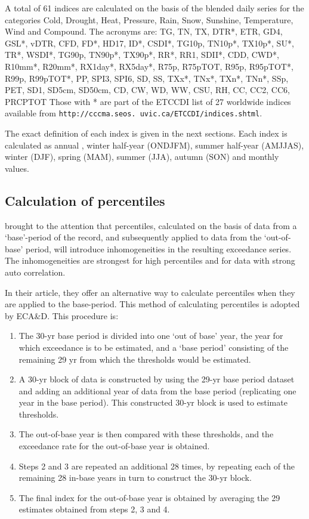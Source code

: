\documentclass[a4paper,11pt]{article}
\begin{document}
A total of 61 indices are calculated on the basis of the blended daily
series for the categories Cold, Drought, Heat, Pressure, Rain, Snow,
Sunshine, Temperature, Wind and Compound. The acronyms are: 
 TG, TN, TX, DTR*, ETR, GD4, GSL*, vDTR, CFD, FD*, HD17, ID*, CSDI*, TG10p, TN10p*, TX10p*, SU*, TR*,
 WSDI*, TG90p, TN90p*, TX90p*, RR*, RR1, SDII*, CDD, CWD*, R10mm*, R20mm*, RX1day*, RX5day*, R75p, R75pTOT,
 R95p, R95pTOT*, R99p, R99pTOT*, PP, SPI3, SPI6, SD, SS, TXx*, TNx*, TXn*, TNn*, SSp, PET, SD1, SD5cm, SD50cm,
 CD, CW, WD, WW, CSU, RH, CC, CC2, CC6, PRCPTOT
Those with * are part of the ETCCDI list of 27 worldwide indices
available from {\tt http://cccma.seos. uvic.ca/ETCCDI/indices.shtml}.


The exact definition of each index is given in the next sections. Each
index is calculated as annual , winter half-year (ONDJFM), summer
half-year (AMJJAS), winter (DJF), spring (MAM), summer (JJA), autumn
(SON) and monthly values.

\subsection{Calculation of percentiles}
\citet{zhang:05} brought to the attention that 
percentiles, calculated on the basis of data from a `base'-period of the record, and subsequently applied
to data from the `out-of-base' period, will introduce inhomogeneities in the resulting exceedance series.
The inhomogeneities are strongest for high percentiles and for data with strong auto correlation.

In their article, they offer an alternative way to calculate percentiles when they are applied to the
base-period. This method of calculating percentiles is adopted by ECA\&D. This procedure is:~\citep[\S 4]{zhang:05}
\begin{enumerate}
\item The 30-yr base period is divided into one `out of base' year, the year for which exceedance is to be estimated,
and a `base period' consisting of the remaining 29 yr from which the thresholds would be estimated.
\item A 30-yr block of data is constructed by using the 29-yr base period dataset and adding an additional
year of data from the base period (replicating one year in the base period). This constructed 30-yr block
 is used to estimate thresholds. 
\item The out-of-base year is then compared with these thresholds, and the exceedance rate for the out-of-base year is obtained.
\item Steps 2 and 3 are repeated an additional 28 times, by repeating each of the remaining 28 in-base years in turn
to construct the 30-yr block.
\item The final index for the out-of-base year is obtained by averaging the 29 estimates obtained from steps 2, 3 and 4.
\end{enumerate}
\end{document}
